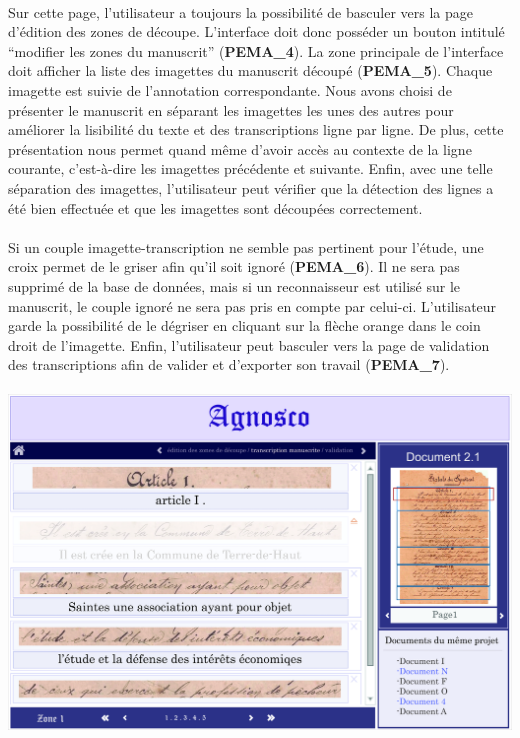 \paragraph{}
Sur cette page, l’utilisateur a toujours la possibilité de basculer vers la
page d’édition des zones de découpe. L’interface doit donc posséder un bouton
intitulé “modifier les zones du manuscrit” (\textbf{PEMA\_4}). La zone
principale de l’interface doit afficher la liste des imagettes du manuscrit
découpé (\textbf{PEMA\_5}). Chaque imagette est suivie de l’annotation
correspondante. Nous avons choisi de présenter le manuscrit en séparant les
imagettes les unes des autres pour améliorer la lisibilité du texte et des
transcriptions ligne par ligne. De plus, cette présentation nous permet quand
même d’avoir accès au contexte de la ligne courante, c’est-à-dire les imagettes
précédente et suivante. Enfin, avec une telle séparation des imagettes,
l’utilisateur peut vérifier que la détection des lignes a été bien effectuée
et que les imagettes sont découpées correctement.

\paragraph{}
Si un couple imagette-transcription ne semble pas pertinent pour l’étude, une
croix permet de le griser afin qu’il soit ignoré (\textbf{PEMA\_6}). Il ne sera
pas supprimé de la base de données, mais si un reconnaisseur est utilisé sur
le manuscrit, le couple ignoré ne sera pas pris en compte par celui-ci.
L’utilisateur garde la possibilité de le dégriser en cliquant sur la flèche
orange dans le coin droit de l’imagette. Enfin, l’utilisateur peut basculer
vers la page de validation des transcriptions afin de valider et d’exporter son
travail (\textbf{PEMA\_7}).

\paragraph{}
\begin{mdframed}[frametitle={Figure 8 : Transcription manuscrite}, innerbottommargin=10]
\begin{center}
\includegraphics[scale=0.05]{ihm3.jpg}
\end{center}
\end{mdframed}

